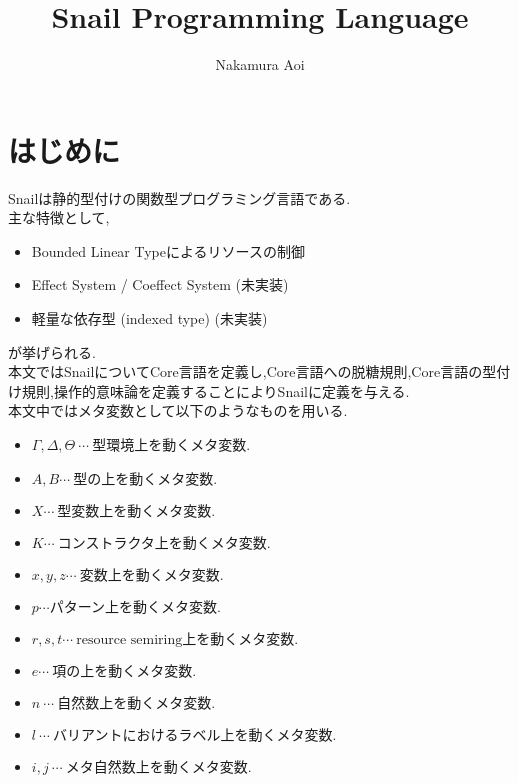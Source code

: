 \documentclass{jsarticle}
\title{Snail Programming Language}
\author{Nakamura Aoi}
\begin{document}
\maketitle

\section{はじめに}

Snailは静的型付けの関数型プログラミング言語である.\\

主な特徴として,
\begin{itemize}
  \item Bounded Linear Typeによるリソースの制御
  \item Effect System / Coeffect System (未実装)
  \item 軽量な依存型 (indexed type) (未実装)
\end{itemize}

が挙げられる.\\

本文ではSnailについてCore言語を定義し,Core言語への脱糖規則,Core言語の型付け規則,操作的意味論を定義することによりSnailに定義を与える.\\

本文中ではメタ変数として以下のようなものを用いる.
\begin{itemize}
  \item $\Gamma , \Delta , \Theta\ \cdots\ \mbox{型環境上を動くメタ変数}$.
  \item $A,B \cdots\ \mbox{型の上を動くメタ変数.}$
  \item $X \cdots\ \mbox{型変数上を動くメタ変数.}$
  \item $K \cdots\ \mbox{コンストラクタ上を動くメタ変数.}$
  \item $x,y,z \cdots\ \mbox{変数上を動くメタ変数.}$
  \item $p \cdots \mbox{パターン上を動くメタ変数.}$
  \item $r,s,t \cdots\ \mbox{resource semiring上を動くメタ変数.}$
  \item $e \cdots\ \mbox{項の上を動くメタ変数.}$
  \item $n\ \cdots\ \mbox{自然数上を動くメタ変数.}$
  \item $l\ \cdots\ \mbox{バリアントにおけるラベル上を動くメタ変数.}$
  \item $i,j\ \cdots\ \mbox{メタ自然数上を動くメタ変数.}$
\end{itemize}

\newpage
\end{document}
